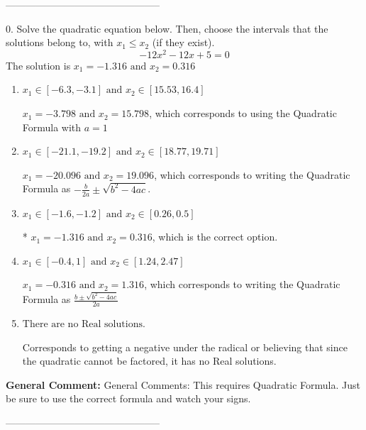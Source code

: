 \documentclass{extbook}[14pt]
\begin{document}
-----------------------------------------------

0. Solve the quadratic equation below. Then, choose the intervals that the solutions belong to, with $x_1 \leq x_2$ (if they exist).
\[ -12x^{2} -12 x + 5 = 0 \] 
The solution is $ x_1 = -1.316 \text{ and } x_2 = 0.316 $ 

\begin{enumerate}[label=\Alph*.] 
\item $ x_1 \in [-6.3, -3.1] \text{ and } x_2 \in [15.53, 16.4] $ 

  $x_1 = -3.798 \text{ and } x_2 = 15.798$, which corresponds to using the Quadratic Formula with $a=1$ 
\item $ x_1 \in [-21.1, -19.2] \text{ and } x_2 \in [18.77, 19.71] $ 

  $x_1 = -20.096 \text{ and } x_2 = 19.096$, which corresponds to writing the Quadratic Formula as $-\frac{b}{2a} \pm \sqrt{b^2 - 4ac}$. 
\item $ x_1 \in [-1.6, -1.2] \text{ and } x_2 \in [0.26, 0.5] $ 

 * $x_1 = -1.316 \text{ and } x_2 = 0.316$, which is the correct option. 
\item $ x_1 \in [-0.4, 1] \text{ and } x_2 \in [1.24, 2.47] $ 

  $x_1 = -0.316 \text{ and } x_2 = 1.316$, which corresponds to writing the Quadratic Formula as $\frac{b \pm \sqrt{b^2 - 4ac}}{2a}$ 
\item $ \text{There are no Real solutions.} $ 

 Corresponds to getting a negative under the radical or believing that since the quadratic cannot be factored, it has no Real solutions. 
\end{enumerate} 
 
\textbf{General Comment:} General Comments: This requires Quadratic Formula. Just be sure to use the correct formula and watch your signs. 

-----------------------------------------------
\end{document}
